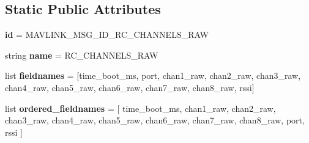 \subsection*{Static Public Attributes}
\begin{DoxyCompactItemize}
\item 
\mbox{\label{classpymavlink_1_1dialects_1_1v10_1_1MAVLink__rc__channels__raw__message_a19092dcf3f4217088465bb84a2c6c482}} 
{\bfseries id} = M\+A\+V\+L\+I\+N\+K\+\_\+\+M\+S\+G\+\_\+\+I\+D\+\_\+\+R\+C\+\_\+\+C\+H\+A\+N\+N\+E\+L\+S\+\_\+\+R\+AW
\item 
\mbox{\label{classpymavlink_1_1dialects_1_1v10_1_1MAVLink__rc__channels__raw__message_acca9dd765c0701e9fb1310caa9d85319}} 
string {\bfseries name} = \textquotesingle{}R\+C\+\_\+\+C\+H\+A\+N\+N\+E\+L\+S\+\_\+\+R\+AW\textquotesingle{}
\item 
\mbox{\label{classpymavlink_1_1dialects_1_1v10_1_1MAVLink__rc__channels__raw__message_a0fff9aed71c71065d0e6f56db53c9c64}} 
list {\bfseries fieldnames} = \mbox{[}\textquotesingle{}time\+\_\+boot\+\_\+ms\textquotesingle{}, \textquotesingle{}port\textquotesingle{}, \textquotesingle{}chan1\+\_\+raw\textquotesingle{}, \textquotesingle{}chan2\+\_\+raw\textquotesingle{}, \textquotesingle{}chan3\+\_\+raw\textquotesingle{}, \textquotesingle{}chan4\+\_\+raw\textquotesingle{}, \textquotesingle{}chan5\+\_\+raw\textquotesingle{}, \textquotesingle{}chan6\+\_\+raw\textquotesingle{}, \textquotesingle{}chan7\+\_\+raw\textquotesingle{}, \textquotesingle{}chan8\+\_\+raw\textquotesingle{}, \textquotesingle{}rssi\textquotesingle{}\mbox{]}
\item 
\mbox{\label{classpymavlink_1_1dialects_1_1v10_1_1MAVLink__rc__channels__raw__message_a6ab5d2ac81e1ba85d9d60edb0caf32b7}} 
list {\bfseries ordered\+\_\+fieldnames} = \mbox{[} \textquotesingle{}time\+\_\+boot\+\_\+ms\textquotesingle{}, \textquotesingle{}chan1\+\_\+raw\textquotesingle{}, \textquotesingle{}chan2\+\_\+raw\textquotesingle{}, \textquotesingle{}chan3\+\_\+raw\textquotesingle{}, \textquotesingle{}chan4\+\_\+raw\textquotesingle{}, \textquotesingle{}chan5\+\_\+raw\textquotesingle{}, \textquotesingle{}chan6\+\_\+raw\textquotesingle{}, \textquotesingle{}chan7\+\_\+raw\textquotesingle{}, \textquotesingle{}chan8\+\_\+raw\textquotesingle{}, \textquotesingle{}port\textquotesingle{}, \textquotesingle{}rssi\textquotesingle{} \mbox{]}

\end{DoxyCompactItemize}
